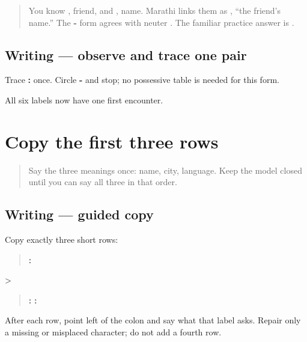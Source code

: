 \label{lesson:MR-A1F01-mitrache-naav}



\begin{quote}
You know \textbf{}, friend, and \textbf{}, name. Marathi links them as \textbf{ }, “the friend's name.” The \textbf{-} form agrees with neuter \textbf{}. The familiar practice answer is \textbf{}.
\end{quote}

\subsection*{Writing — observe and trace one pair}
Trace \textbf{ : } once. Circle \textbf{-} and stop; no possessive table is needed for this form.

\begin{tcolorbox}[breakable,colback=teal!4,colframe=teal!35!black,title={Before you move on}]
All six labels now have one first encounter.
\end{tcolorbox}
\section[nāv · śahar · bhāṣā]{Copy the first three rows}

\label{lesson:MR-A1F02-first-three-copy}



\begin{quote}
Say the three meanings once: name, city, language. Keep the model closed until you can say all three in that order.
\end{quote}

\subsection*{Writing — guided copy}
Copy exactly three short rows:

\begin{quote}
\textbf{: }
\end{quote}

>

\begin{quote}
\textbf{: } \textbf{: }
\end{quote}

After each row, point left of the colon and say what that label asks. Repair only a missing or misplaced character; do not add a fourth row.

